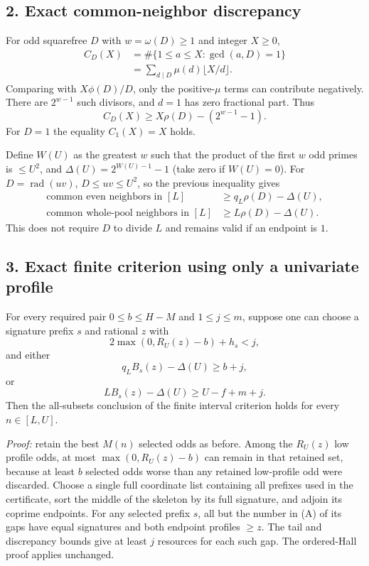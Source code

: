 \subsection*{2. Exact common-neighbor discrepancy}
For odd squarefree $D$ with $w=\omega(D)\ge1$ and integer $X\ge0$,
\[
\begin{aligned}
C_D(X)&=\#\{1\le a\le X:\gcd(a,D)=1\}\\
&=\sum_{d\mid D}\mu(d)\lfloor X/d\rfloor.
\end{aligned}
\]
Comparing with $X\phi(D)/D$, only the positive-$\mu$ terms can contribute negatively. There are $2^{w-1}$ such divisors, and $d=1$ has zero fractional part. Thus
\[
C_D(X)\ge X\rho(D)-(2^{w-1}-1).
\]
For $D=1$ the equality $C_1(X)=X$ holds.

Define $W(U)$ as the greatest $w$ such that the product of the first $w$ odd primes is $\le U^2$, and $\Delta(U)=2^{W(U)-1}-1$ (take zero if $W(U)=0$).
For $D=\operatorname{rad}(uv)$, $D\le uv\le U^2$, so the previous inequality gives
\[
\begin{aligned}
\text{common even neighbors in }[L]&\ge q_L\rho(D)-\Delta(U),\\
\text{common whole-pool neighbors in }[L]&\ge L\rho(D)-\Delta(U).
\end{aligned}
\]
This does not require $D$ to divide $L$ and remains valid if an endpoint is $1$.

\subsection*{3. Exact finite criterion using only a univariate profile}
For every required pair $0\le b\le H-M$ and $1\le j\le m$, suppose one can choose a signature prefix $s$ and rational $z$ with
\begin{equation}
2\max(0,R_U(z)-b)+h_s<j, \tag{A}
\end{equation}
and either
\begin{equation}
q_LB_s(z)-\Delta(U)\ge b+j, \tag{$B_E$}
\end{equation}
or
\begin{equation}
LB_s(z)-\Delta(U)\ge U-f+m+j. \tag{$B_R$}
\end{equation}
Then the all-subsets conclusion of the finite interval criterion holds for every $n\in[L,U]$.

\noindent\textit{Proof:} retain the best $M(n)$ selected odds as before. Among the $R_U(z)$ low profile odds, at most $\max(0,R_U(z)-b)$ can remain in that retained set, because at least $b$ selected odds worse than any retained low-profile odd were discarded. Choose a single full coordinate list containing all prefixes used in the certificate, sort the middle of the skeleton by its full signature, and adjoin its coprime endpoints. For any selected prefix $s$, all but the number in (A) of its gaps have equal signatures and both endpoint profiles $\ge z$. The tail and discrepancy bounds give at least $j$ resources for each such gap. The ordered-Hall proof applies unchanged.

